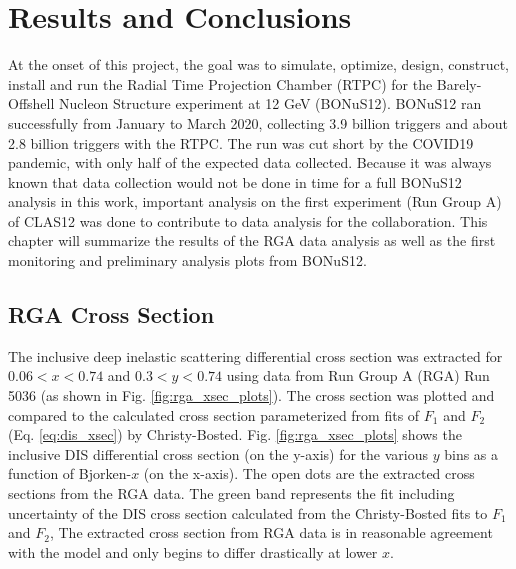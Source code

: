 \chapter{Results and Conclusions}
\label{ch:results}
At the onset of this project, the goal was to simulate, optimize, design, construct, install and run the Radial Time Projection Chamber (RTPC) for the Barely-Offshell Nucleon Structure experiment at 12 GeV (BONuS12). BONuS12 ran successfully from January to March 2020, collecting 3.9 billion triggers and about 2.8 billion triggers with the RTPC. The run was cut short by the COVID19 pandemic, with only half of the expected data collected. Because it was always known that data collection would not be done in time for a full BONuS12 analysis in this work, important analysis on the first experiment (Run Group A) of CLAS12 was done to contribute to data analysis for the collaboration. This chapter will summarize the results of the RGA data analysis as well as the first monitoring and preliminary analysis plots from BONuS12.

\section{RGA Cross Section}
The inclusive deep inelastic scattering differential cross section was extracted for $0.06 < x < 0.74$ and $0.3< y < 0.74$ using data from Run Group A (RGA) Run 5036 (as shown in Fig. \ref{fig:rga_xsec_plots}). The cross section was plotted and compared to the calculated cross section parameterized from fits of $F_1$ and $F_2$ (Eq. \ref{eq:dis_xsec}) by Christy-Bosted.\cite{christy_bosted} Fig. \ref{fig:rga_xsec_plots} shows the inclusive DIS differential cross section (on the y-axis) for the various $y$ bins as a function of Bjorken-$x$ (on the x-axis). The open dots are the extracted cross sections from the RGA data. The green band represents the fit including uncertainty of the DIS cross section calculated from the Christy-Bosted fits to $F_1$ and $F_2$,\cite{christy_bosted} The extracted cross section from RGA data is in reasonable agreement with the model and only begins to differ drastically at lower $x$.

